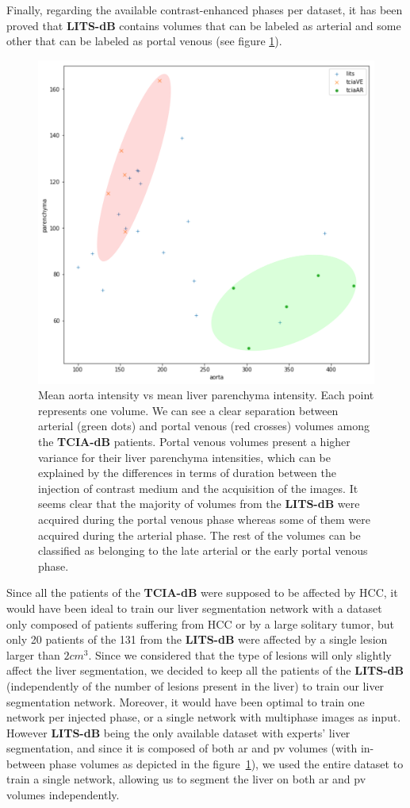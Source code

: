 \documentclass[]{article}
\newcommand{\lmttfont}[1]{{\fontfamily{lmtt}\selectfont #1}}
\begin{document}
Finally, regarding the available contrast-enhanced phases per dataset, it has been proved that \textbf{\lmttfont{LITS-dB}} contains volumes that can be labeled as arterial and some other that can be labeled as portal venous (see figure \ref{fig:LitsTciaPhasePlot}).
\begin{figure}[!ht]
	\centering
	\includegraphics[width=0.6\linewidth]{../Contributions/images/AortaParPlot}
	\caption{Mean aorta intensity vs mean liver parenchyma intensity. Each point represents one volume. We can see a clear separation between arterial (green dots) and portal venous (red crosses) volumes among the \textbf{\lmttfont{TCIA-dB}} patients. Portal venous volumes present a higher variance for their liver parenchyma intensities, which can be explained by the differences in terms of duration between the injection of contrast medium and the acquisition of the images. It seems clear that the majority of volumes from the \textbf{\lmttfont{LITS-dB}} were acquired during the portal venous phase whereas some of them were acquired during the arterial phase. The rest of the volumes can be classified as belonging to the late arterial or the early portal venous phase.
	}
	\label{fig:LitsTciaPhasePlot}
\end{figure}
Since all the patients of the \textbf{\lmttfont{TCIA-dB}} were supposed to be affected by HCC, it would have been ideal to train our liver segmentation network with a dataset only composed of patients suffering from HCC or by a large solitary tumor, but only 20 patients of the 131 from the \textbf{\lmttfont{LITS-dB}} were affected by a single lesion larger than $ 2cm^3 $.
Since we considered that the type of lesions will only slightly affect the liver segmentation, we decided to keep all the patients of the \textbf{\lmttfont{LITS-dB}} (independently of the number of lesions present in the liver) to train our liver segmentation network.
Moreover, it would have been optimal to train one network per injected phase, or a single network with multiphase images as input.
However \textbf{\lmttfont{LITS-dB}} being the only available dataset with experts' liver segmentation, and since it is composed of both \ac{ar} and \ac{pv} volumes (with in-between phase volumes as depicted in the figure \ref{fig:LitsTciaPhasePlot}), we used the entire dataset to train a single network, allowing us to segment the liver on both \ac{ar} and \ac{pv} volumes independently.
\end{document}
